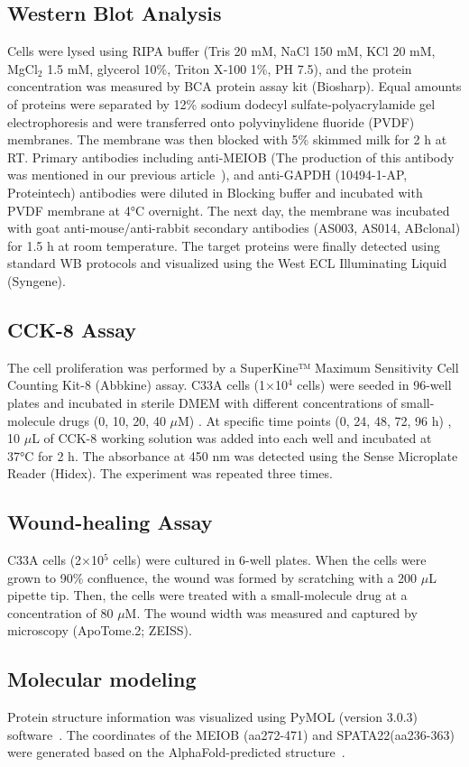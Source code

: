 \documentclass[unnumsec,webpdf,contemporary,large]{oup-authoring-template}%
\theoremstyle{thmstyleone}%
\theoremstyle{thmstyletwo}%
\theoremstyle{thmstylethree}%
\begin{document}
\subsection*{Western Blot Analysis}
Cells were lysed using RIPA buffer (Tris 20 mM, NaCl 150 mM, KCl 20 mM, MgCl$_2$ 1.5 mM, glycerol 10\%, Triton X‐100 1\%, PH 7.5), and the protein concentration was measured by BCA protein assay kit (Biosharp). Equal amounts of proteins were separated by 12\% sodium dodecyl sulfate‐polyacrylamide gel electrophoresis and were transferred onto polyvinylidene fluoride (PVDF) membranes. The membrane was then blocked with 5\% skimmed milk for 2 h at RT. Primary antibodies including anti-MEIOB (The production of this antibody was mentioned in our previous article~\cite{6}), and anti-GAPDH (10494-1-AP, Proteintech) antibodies were diluted in Blocking buffer and incubated with PVDF membrane at 4°C overnight. The next day, the membrane was incubated with goat anti-mouse/anti-rabbit secondary antibodies (AS003, AS014, ABclonal) for 1.5 h at room temperature. The target proteins were finally detected using standard WB protocols and visualized using the West ECL Illuminating Liquid (Syngene). 

\subsection*{CCK-8 Assay}
The cell proliferation was performed by a SuperKine™ Maximum Sensitivity Cell Counting Kit-8 (Abbkine) assay. C33A cells (1×10$^{4}$ cells) were seeded in 96-well plates and incubated in sterile DMEM with different concentrations of small-molecule drugs (0, 10, 20, 40 $\mu$M) . At specific time points (0, 24, 48, 72, 96 h) , 10 $\mu$L of CCK-8 working solution was added into each well and incubated at 37°C for 2 h. The absorbance at 450 nm was detected using the Sense Microplate Reader (Hidex). The experiment was repeated three times.

\subsection*{Wound-healing Assay}
C33A cells (2×10$^{5}$ cells) were cultured in 6-well plates. When the cells were grown to 90\% confluence, the wound was formed by scratching with a 200 $\mu$L pipette tip. Then, the cells were treated with a small-molecule drug at a concentration of 80 $\mu$M. The wound width was measured and captured by microscopy (ApoTome.2; ZEISS).

\subsection*{Molecular modeling}
Protein structure information was visualized using PyMOL (version 3.0.3) software~\cite{68}. The coordinates of the MEIOB (aa272-471) and SPATA22(aa236-363) were generated based on the AlphaFold-predicted structure~\cite{69}.
\end{document}
